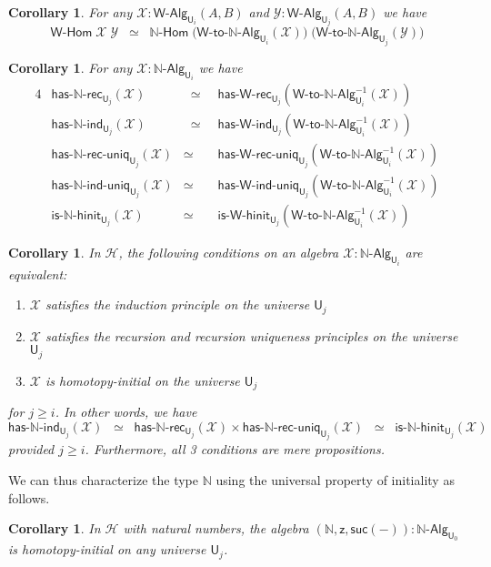 \documentclass[reqno,10pt,a4paper,oneside]{amsart}
\numberwithin{equation}{section}
\theoremstyle{mythm}
\newtheorem{corollary}[theorem]{Corollary}
\theoremstyle{mydef}
\theoremstyle{myrmk}
\newcommand{\Hint}{\mathcal{H}}
\newcommand{\nat}{\ensuremath{\mathbb{N}}}
\newcommand{\suc}{\mathsf{suc}}
\newcommand{\W}{\mathsf{W}}
\newcommand{\UU}{\mathsf{U}}
\newcommand{\NatAlg}{\nat\text{-}\mathsf{Alg}}
\newcommand{\NatHom}{\nat\text{-}\mathsf{Hom}}
\newcommand{\HasNatRec}{\mathsf{has}\text{-}\nat\text{-}\mathsf{rec}}
\newcommand{\HasNatInd}{\mathsf{has}\text{-}\nat\text{-}\mathsf{ind}}
\newcommand{\HasNatRecUniq}{\mathsf{has}\text{-}\nat\text{-}\mathsf{rec}\text{-}\mathsf{uniq}}
\newcommand{\HasNatIndUniq}{\mathsf{has}\text{-}\nat\text{-}\mathsf{ind}\text{-}\mathsf{uniq}}
\newcommand{\IsNatHInit}{\mathsf{is}\text{-}\nat\text{-}\mathsf{hinit}}
\newcommand{\WAlgToNatAlg}{\W\text{-}\mathsf{to}\text{-}\nat\text{-}\mathsf{Alg}}
\newcommand{\WAlg}{\mathsf{W}\text{-}\mathsf{Alg}}
\newcommand{\WHom}{\mathsf{W}\text{-}\mathsf{Hom}}
\newcommand{\HasWRec}{\mathsf{has}\text{-}\mathsf{W}\text{-}\mathsf{rec}}
\newcommand{\HasWInd}{\mathsf{has}\text{-}\mathsf{W}\text{-}\mathsf{ind}}
\newcommand{\HasWRecUniq}{\mathsf{has}\text{-}\mathsf{W}\text{-}\mathsf{rec}\text{-}\mathsf{uniq}}
\newcommand{\HasWIndUniq}{\mathsf{has}\text{-}\mathsf{W}\text{-}\mathsf{ind}\text{-}\mathsf{uniq}}
\newcommand{\IsWHInit}{\mathsf{is}\text{-}\mathsf{\W}\text{-}\mathsf{hinit}}
\newcommand{\X}{\mathcal{X}}
\newcommand{\Y}{\mathcal{Y}}
\newcommand{\z}{\mathsf{z}}
\begin{document}
\begin{corollary}
For any $\X : \WAlg_{\UU_i}(A,B)$ and $\Y : \WAlg_{\UU_j}(A,B)$ we have
\[ \WHom \; \X \; \Y \;\; \simeq \;\; \NatHom \; \big(\WAlgToNatAlg_{\UU_i}(\X)\big) \; \big(\WAlgToNatAlg_{\UU_j}(\Y)\big) \]
\end{corollary}

\begin{corollary}
For any $\X : \NatAlg_{\UU_i}$ we have
\begin{alignat*}{4}
& \HasNatRec_{\UU_j}(\X) & \;\; \simeq \;\; & \HasWRec_{\UU_j}(\WAlgToNatAlg_{\UU_i}^{-1}(\X)) \\
& \HasNatInd_{\UU_j}(\X) & \;\; \simeq \;\; & \HasWInd_{\UU_j}(\WAlgToNatAlg_{\UU_i}^{-1}(\X)) \\
& \HasNatRecUniq_{\UU_j}(\X) &  \simeq \;\; & \HasWRecUniq_{\UU_j}(\WAlgToNatAlg_{\UU_i}^{-1}(\X)) \\
& \HasNatIndUniq_{\UU_j}(\X) & \simeq \;\; &  \HasWIndUniq_{\UU_j}(\WAlgToNatAlg_{\UU_i}^{-1}(\X)) \\
& \IsNatHInit_{\UU_j}(\X) & \simeq \;\; & \IsWHInit_{\UU_j}(\WAlgToNatAlg_{\UU_i}^{-1}(\X))
\end{alignat*}
\end{corollary}

\begin{corollary}\label{lem:NatMainInt}
In $\Hint$, the following conditions on an algebra $\X : \NatAlg_{\UU_i}$ are equivalent:
\begin{enumerate}
\item $\X$ satisfies the induction principle on the universe $\UU_j$
\item $\X$ satisfies the recursion and recursion uniqueness principles on the universe $\UU_j$
\item $\X$ is homotopy-initial on the universe $\UU_j$  
\end{enumerate}
for $j \geq i$. In other words, we have \[ \HasNatInd_{\UU_j}(\X)  \;\; \simeq \;\; \HasNatRec_{\UU_j}(\X) \times \HasNatRecUniq_{\UU_j}(\X) \;\; \simeq \;\; \IsNatHInit_{\UU_j}(\X) \]
provided $j \geq i$. Furthermore, all 3 conditions are mere propositions.
\end{corollary}

We can thus characterize the type $\nat$ using the universal property of initiality as follows.
\begin{corollary}\label{lem:NatInitInt}
In $\Hint$ with natural numbers, the algebra $(\nat,\z,\suc(-)) : \NatAlg_{\UU_0}$ is homotopy-initial on any universe $\UU_j$.
\end{corollary}
\end{document}

